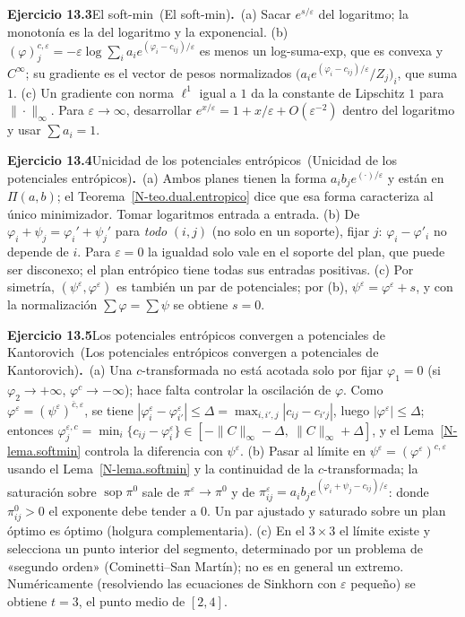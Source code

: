 \documentclass[11pt,a4paper]{amsart}
\def\sop{\operatorname {\mathrm{sop}}}
\newcommand{\ve}{\varepsilon}
\theoremstyle{remark}
\theoremstyle{definition}
\numberwithin{subsection}{section}
\numberwithin{equation}{section}
\newcommand{\ejlabel}[2]{\par\medskip\noindent\textbf{Ejercicio #1}\ifx\relax#2\relax\else\ (#2)\fi\textbf{.}\ }
\begin{document}
\ejlabel{13.3}{El soft-min}(a) Sacar $e^{s/\ve}$ del logaritmo; la monotonía es la del logaritmo y la exponencial. (b) $(\varphi)^{c,\ve}_j=-\ve\log\sum_ia_ie^{(\varphi_i-c_{ij})/\ve}$ es menos un log-suma-exp, que es convexa y $C^\infty$; su gradiente es el vector de pesos normalizados $\bigl(a_ie^{(\varphi_i-c_{ij})/\ve}/Z_j\bigr)_i$, que suma $1$. (c) Un gradiente con norma $\ell^1$ igual a $1$ da la constante de Lipschitz $1$ para $\|\cdot\|_\infty$. Para $\ve\to\infty$, desarrollar $e^{x/\ve}=1+x/\ve+O(\ve^{-2})$ dentro del logaritmo y usar $\sum a_i=1$.

\ejlabel{13.4}{Unicidad de los potenciales entrópicos}(a) Ambos planes tienen la forma $a_ib_je^{(\cdot)/\ve}$ y están en $\Pi(a,b)$; el Teorema~\ref{N-teo.dual.entropico} dice que esa forma caracteriza al único minimizador. Tomar logaritmos entrada a entrada. (b) De $\varphi_i+\psi_j=\varphi_i'+\psi_j'$ para \emph{todo} $(i,j)$ (no solo en un soporte), fijar $j$: $\varphi_i-\varphi'_i$ no depende de $i$. Para $\ve=0$ la igualdad solo vale en el soporte del plan, que puede ser disconexo; el plan entrópico tiene todas sus entradas positivas. (c) Por simetría, $(\psi^\ve,\varphi^\ve)$ es también un par de potenciales; por (b), $\psi^\ve=\varphi^\ve+s$, y con la normalización $\sum\varphi=\sum\psi$ se obtiene $s=0$.

\ejlabel{13.5}{Los potenciales entrópicos convergen a potenciales de Kantorovich}(a) Una $c$-transformada no está acotada solo por fijar $\varphi_1=0$ (si $\varphi_2\to+\infty$, $\varphi^c\to-\infty$); hace falta controlar la oscilación de $\varphi$. Como $\varphi^\ve=(\psi^\ve)^{\bar c,\ve}$, se tiene $|\varphi^\ve_i-\varphi^\ve_{i'}|\le\Delta=\max_{i,i',j}|c_{ij}-c_{i'j}|$, luego $|\varphi^\ve|\le\Delta$; entonces $\varphi^{\ve,c}_j=\min_i\{c_{ij}-\varphi^\ve_i\}\in[-\|C\|_\infty-\Delta,\ \|C\|_\infty+\Delta]$, y el Lema~\ref{N-lema.softmin} controla la diferencia con $\psi^\ve$. (b) Pasar al límite en $\psi^\ve=(\varphi^\ve)^{c,\ve}$ usando el Lema~\ref{N-lema.softmin} y la continuidad de la $c$-transformada; la saturación sobre $\sop\pi^0$ sale de $\pi^\ve\to\pi^0$ y de $\pi^\ve_{ij}=a_ib_je^{(\varphi_i+\psi_j-c_{ij})/\ve}$: donde $\pi^0_{ij}>0$ el exponente debe tender a $0$. Un par ajustado y saturado sobre un plan óptimo es óptimo (holgura complementaria). (c) En el $3\times3$ el límite existe y selecciona un punto interior del segmento, determinado por un problema de «segundo orden» (Cominetti--San Martín); no es en general un extremo. Numéricamente (resolviendo las ecuaciones de Sinkhorn con $\ve$ pequeño) se obtiene $t=3$, el punto medio de $[2,4]$.
\end{document}
